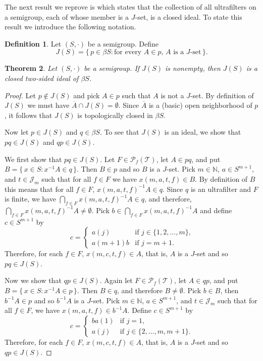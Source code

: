 \documentclass[12pt,showtrims]{memoir}
\theoremstyle{plain}
\newtheorem{thm}{Theorem}[section]
\theoremstyle{definition}
\newtheorem{defn}[thm]{Definition}
\newcommand{\bbN}{\mathbb{N}}
\newcommand{\calJ}{\mathcal{J}}
\newcommand{\calT}{\mathcal{T}}
\newcommand{\Pf}{\mathcal{P}_f}
\begin{document}
The next result we reprove is \cite[Theorem 3.4]{De:2008uq} which states that the collection of all ultrafilters on a semigroup, each of whose member is a $J$-set, is a closed ideal.
To state this result we introduce the following notation.

\begin{defn}
  Let $(S, \cdot)$ be a semigroup. 
  Define
  \[
    J(S) = \{\, p \in \beta S : \mbox{for every $A \in p$, $A$ is a $J$-set} \,\}.
  \]
\end{defn}

\begin{thm}
  Let $(S, \cdot)$ be a semigroup.
  If $J(S)$ is nonempty, then $J(S)$ is a closed two-sided ideal of $\beta S$.
\end{thm}
\begin{proof}
  Let $p \not\in J(S)$ and pick $A \in p$ such that $A$ is not a $J$-set.
  By definition of $J(S)$ we must have $\overline{A} \cap J(S) = \emptyset$.
  Since $\overline{A}$ is a (basic) open neighborhood of $p$, it follows that $J(S)$ is topologically closed in $\beta S$.

  Now let $p \in J(S)$ and $q \in \beta S$.
  To see that $J(S)$ is an ideal, we show that $pq \in J(S)$ and $qp \in J(S)$. 

  We first show that $pq \in J(S)$.
  Let $F \in \Pf(\calT)$, let $A \in pq$, and put $B = \{\, x \in S : x^{-1}A \in q \,\}$.
  Then $B \in p$ and so $B$ is a $J$-set.
  Pick $m \in \bbN$, $a \in S^{m+1}$, and $t \in \calJ_m$ such that for all $f \in F$ we have $x(m, a, t, f) \in B$.
  By definition of $B$ this means that for all $f \in F$, $x(m, a, t, f)^{-1}A \in q$. 
  Since $q$ is an ultrafilter and $F$ is finite, we have $\bigcap_{f \in F} x(m, a, t, f)^{-1}A \in q$, and therefore, $\bigcap_{f \in F} x(m, a, t, f)^{-1}A \ne \emptyset$.
  Pick $b \in \bigcap_{f \in F} x(m, a, t, f)^{-1}A$ and define $c \in S^{m+1}$ by
  \[
    c =
    \begin{cases}
      a(j) & \mbox{if $j \in \{1, 2, \ldots, m\}$,} \\
      a(m+1)b & \mbox{if $j = m+1$.}
    \end{cases}
  \]
  Therefore, for each $f \in F$, $x(m, c, t, f) \in A$, that is, $A$ is a $J$-set and so $pq \in J(S)$.

  Now we show that $qp \in J(S)$.
  Again let $F \in \Pf(\calT)$, let $A \in qp$, and put $B = \{\, x \in S : x^{-1}A \in p \,\}$.
  Then $B \in q$, and therefore $B \ne \emptyset$.
  Pick $b \in B$, then $b^{-1}A \in p$ and so $b^{-1}A$ is a $J$-set.
  Pick $m \in \bbN$, $a \in S^{m+1}$, and $t \in \calJ_m$ such that for all $f \in F$, we have $x(m, a, t, f) \in b^{-1}A$.
  Define $c \in S^{m+1}$ by
  \[
    c =
    \begin{cases}
      ba(1) & \mbox{if $j =1$,} \\
      a(j) & \mbox{if $j \in \{2, \ldots, m, m+1\}$.}
    \end{cases}
  \]
  Therefore, for each $f \in F$, $x(m, c, t, f) \in A$, that is, $A$ is a $J$-set and so $qp \in J(S)$.
\end{proof}
\end{document}
